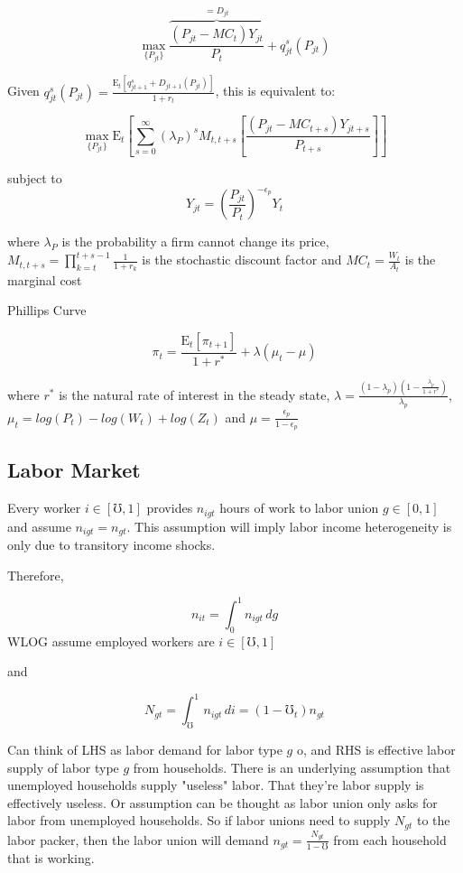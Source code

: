 \documentclass[titlepage]{\econtex}\providecommand{\texname}{BufferStockTheory}
\begin{document}
 $$\max_{\{P_{jt}\}} \overbrace{\frac{(P_{jt} - MC_{t})Y_{jt}}{P_{t}}}^{=D_{jt}} + q^{s}_{jt}\left(P_{jt}\right) $$
 
Given $q^{s}_{jt}\left(P_{jt}\right) = \frac{\mathrm{E}_{t}\left[q^{s}_{jt+1} +D_{jt+1}\left(P_{jt}\right)\right]}{1+r_{t}}$, this is equivalent to: 
 
 $$\max_{\{P_{jt}\}} \mathrm{E}_{t}\left[\sum_{s=0}^{\infty} (\lambda_{P}) ^{s} M_{t,t+s} \left[ \frac{(P_{jt} - MC_{t+s})Y_{jt+s}}{P_{t+s}}\right]\right]$$
 
subject to $$Y_{jt} = \left(\frac {P_{jt}}{P_{t}}\right)^{- \epsilon_{p}} Y_{t}$$
 
where $ \lambda_{P}$ is the  probability a firm cannot change its price,  $M_{t, t+s} = \prod_{k=t}^{t+s-1} \frac{1}{1+r_{k}}$ is the stochastic discount factor and $MC_{t} = \frac{W_{t}}{A_{t}}$ is the marginal cost

Phillips Curve

$$ \pi_{t} = \frac{\mathrm{E}_{t}[\pi_{t+1}]}{1+r^{*}} + \lambda (\mu_{t}-\mu)$$

where $r^{*}$ is the natural rate of interest in the steady state, $\lambda = \frac{(1-\lambda_{p})(1-\frac{\lambda_{p}}{1+r^{*}})}{\lambda_{p}}$,  $ \mu_{t} = log(P_{t}) - log(W_{t}) + log(Z_{t})$ and $\mu = \frac{\epsilon_{p}}{1-\epsilon_{p}}$

\hypertarget{Labor Market}{}
\subsection{Labor Market}


Every worker $i \in [\mho,1]$ provides $n_{igt}$ hours of work to labor union $g \in [0,1]$ and assume $n_{igt} = \mathit{n}_{gt}$. This assumption will imply labor income heterogeneity is only due to transitory income shocks.

Therefore, 

$$n_{it} = \int_{0}^{1} n_{igt}\,dg$$ WLOG assume employed workers are $i \in [\mho,1]$

and 

$$N_{gt} = \int_{\mho}^{1} n_{igt}\,di = (1-\mho_{t}) \mathit{n}_{gt}$$ 

Can think of LHS as labor demand for labor type $g$ o, and RHS is effective labor supply of labor type $g$ from households. There is an underlying assumption that unemployed households supply  "useless" labor. That they're labor supply is effectively useless. Or assumption can be thought as labor union only asks for labor from unemployed households. So if labor unions need to supply $N_{gt}$ to the labor packer, then the labor union will demand $ n_{gt} = \frac{N_{gt}}{1-\mho}$ from each household that is working.
\end{document}
